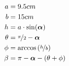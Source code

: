 \documentclass[a4paper]{report}
\begin{document}
\begin{align*}
	a &= 9.5 cm\\
	b &= 15 cm\\
	h &= a \cdot \sin(\bm{\alpha})\\
	\theta &= \nicefrac{\pi}{2} - \bm{\alpha}\\
	\phi &= \arccos\left(\nicefrac{h}{b}\right)\\
	\beta &= \pi - \bm{\alpha} - (\theta + \phi)\\
\end{align*}
\end{document}
